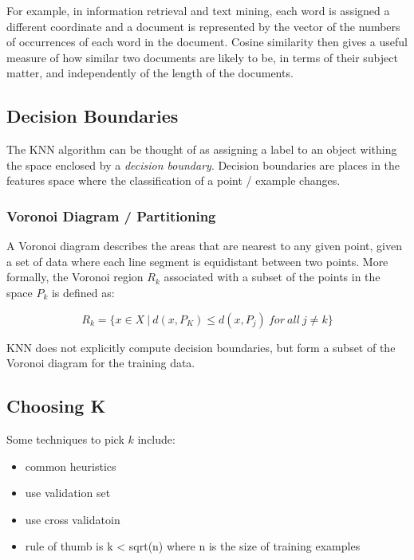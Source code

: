 \documentclass[11pt]{article}
\begin{document}
For example, in information retrieval and text mining, each word is
assigned a different coordinate and a document is represented by the
vector of the numbers of occurrences of each word in the document.
Cosine similarity then gives a useful measure of how similar two
documents are likely to be, in terms of their subject matter, and
independently of the length of the documents.

\subsection{Decision Boundaries}\label{decision-boundaries}

The KNN algorithm can be thought of as assigning a label to an object
withing the space enclosed by a \emph{decision boundary}. Decision
boundaries are places in the features space where the classification of
a point / example changes.

\subsubsection{Voronoi Diagram /
Partitioning}\label{voronoi-diagram-partitioning}

A Voronoi diagram describes the areas that are nearest to any given
point, given a set of data where each line segment is equidistant
between two points. More formally, the Voronoi region \(R_k\) associated
with a subset of the points in the space \(P_k\) is defined as:

\[R_k = \{ x\in X\ |\ d(x, P_K)\le d(x, P_j)\ for\ all\ j\ne k  \}\]

KNN does not explicitly compute decision boundaries, but form a subset
of the Voronoi diagram for the training data.

\subsection{Choosing K}\label{choosing-k}

Some techniques to pick \(k\) include:

\begin{itemize}
\tightlist
\item
  common heuristics
\item
  use validation set
\item
  use cross validatoin
\item
  rule of thumb is k \textless{} sqrt(n) where n is the size of training
  examples
\end{itemize}
\end{document}
